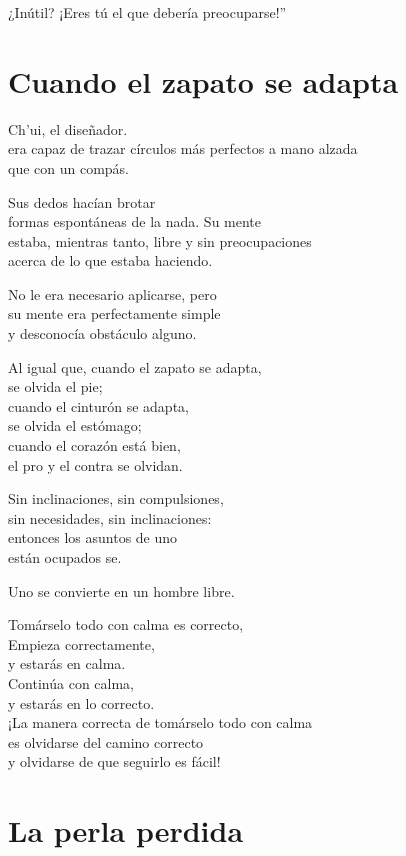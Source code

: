 \documentclass[book,b5paper,hidelinks,final]{memoir}
\begin{document}
	¿Inútil? ¡Eres tú el que debería preocuparse!''
	
	\chapter*{Cuando el zapato se adapta}
	
	Ch'ui, el diseñador.\\
	era capaz de trazar círculos más perfectos a mano alzada\\
	que con un compás.
	
	Sus dedos hacían brotar\\
	formas espontáneas de la nada. Su mente\\
	estaba, mientras tanto, libre y sin preocupaciones\\
	acerca de lo que estaba haciendo.
	
	No le era necesario aplicarse, pero\\
	su mente era perfectamente simple\\
	y desconocía obstáculo alguno.
	
	Al igual que, cuando el zapato se adapta,\\
	se olvida el pie;\\
	cuando el cinturón se adapta,\\
	se olvida el estómago;\\
	cuando el corazón está bien,\\
	el pro y el contra se olvidan.
	
	Sin inclinaciones, sin compulsiones,\\
	sin necesidades, sin inclinaciones:\\
	entonces los asuntos de uno\\
	están ocupados se.
	
	Uno se convierte en un hombre libre.
	
	Tomárselo todo con calma es correcto,\\
	Empieza correctamente,\\
	y estarás en calma.\\
	Continúa con calma,\\
	y estarás en lo correcto.\\
	¡La manera correcta de tomárselo todo con calma\\
	es olvidarse del camino correcto\\
	y olvidarse de que seguirlo es fácil!
	
	\chapter*{La perla perdida}
	
\end{document}
